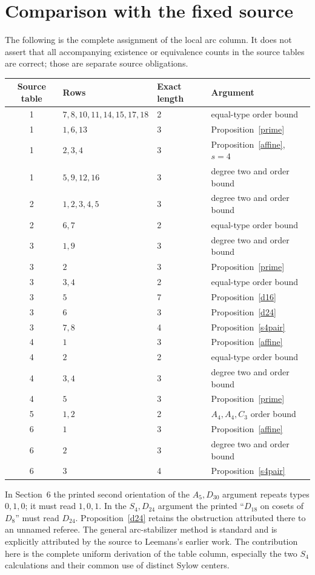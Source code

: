\documentclass[11pt]{article}
\begin{document}
\section{Comparison with the fixed source}
The following is the complete assignment of the local arc column. It
does not assert that all accompanying existence or equivalence counts
in the source tables are correct; those are separate source obligations.
\begin{center}\small
\begin{tabular}{clll}
\toprule
Source table&Rows&Exact length&Argument\\\midrule
1&$7,8,10,11,14,15,17,18$&2&equal-type order bound\\
1&$1,6,13$&3&Proposition~\ref{prime}\\
1&$2,3,4$&3&Proposition~\ref{affine}, $s=4$\\
1&$5,9,12,16$&3&degree two and order bound\\
2&$1,2,3,4,5$&3&degree two and order bound\\
2&$6,7$&2&equal-type order bound\\
3&$1,9$&3&degree two and order bound\\
3&$2$&3&Proposition~\ref{prime}\\
3&$3,4$&2&equal-type order bound\\
3&$5$&7&Proposition~\ref{d16}\\
3&$6$&3&Proposition~\ref{d24}\\
3&$7,8$&4&Proposition~\ref{s4pair}\\
4&$1$&3&Proposition~\ref{affine}\\
4&$2$&2&equal-type order bound\\
4&$3,4$&3&degree two and order bound\\
4&$5$&3&Proposition~\ref{prime}\\
5&$1,2$&2&$A_4,A_4,C_3$ order bound\\
6&$1$&3&Proposition~\ref{affine}\\
6&$2$&3&degree two and order bound\\
6&$3$&4&Proposition~\ref{s4pair}\\\bottomrule
\end{tabular}\end{center}

In Section~6 the printed second orientation of the $A_5,D_{30}$
argument repeats types $0,1,0$; it must read $1,0,1$. In the
$S_4,D_{24}$ argument the printed ``$D_{18}$ on cosets of $D_8$''
must read $D_{24}$. Proposition~\ref{d24} retains the obstruction
attributed there to an unnamed referee. The general arc-stabilizer
method is standard and is explicitly attributed by the source to
Leemans's earlier work. The contribution here is the complete uniform
derivation of the table column, especially the two $S_4$ calculations
and their common use of distinct Sylow centers.
\end{document}
